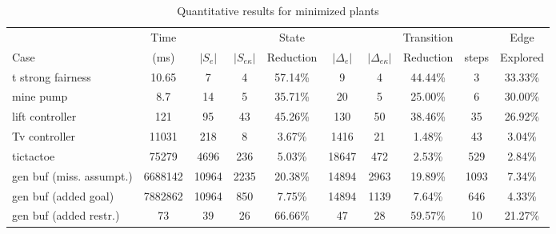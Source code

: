 \begin{table*}
\centering
  \begin{tabular}{ | l | c | c | c | c | c | c | c | c | c | }
    \hline
 & Time & &  &State&  & &Transition&&Edge\\
Case & (ms) & $|S_e|$ & $|S_{e\kappa}|$ &Reduction& $|\Delta_e|$ & $|\Delta_{e\kappa}|$ &Reduction&steps&Explored\\
    \hline
t strong fairness&10.65&7&4&57.14\%&9&4&44.44\%&3&33.33\%\\
mine pump &8.7&14&5&35.71\%&20&5&25.00\%&6&30.00\%\\
lift controller&121&95&43&45.26\%&130&50&38.46\%&35&26.92\%\\
Tv controller&11031&218&8&3.67\%&1416&21&1.48\%&43&3.04\%\\
tictactoe&75279&4696&236&5.03\%&18647&472&2.53\%&529&2.84\%\\
gen buf (miss. assumpt.)&6688142&10964&2235&20.38\%&14894&2963&19.89\%&1093&7.34\%\\
gen buf (added goal)&7882862&10964&850&7.75\%&14894&1139&7.64\%&646&4.33\%\\
gen buf (added restr.)&73&39&26&66.66\%&47&28&59.57\%&10&21.27\%\\
\hline    
  \end{tabular}
  \vspace*{2mm}
  \caption{Quantitative results for minimized plants}
  \label{table:quantitative-results}
 \end{table*}




